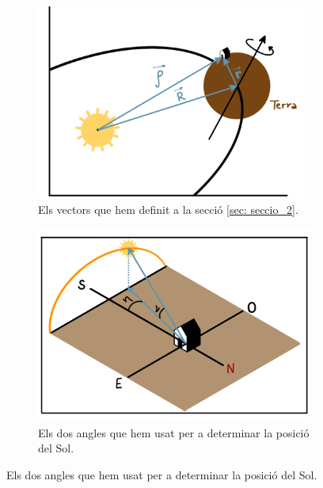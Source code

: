 \documentclass[11pt]{article}
\begin{document}
\begin{figure}[hbt]
    \centering
    \begin{subfigure}{0.5\textwidth}
        \centering
        \includegraphics[width=\textwidth]{vectors.PNG}
        \caption{Els vectors que hem definit a la secció \ref{sec: seccio_2}.}
        \label{fig: sist_vectors}
    \end{subfigure}%
    \hspace{0.000001\textwidth}%
    \begin{subfigure}{0.5\textwidth}
        \centering
        \includegraphics[width=\textwidth]{ang_sol.PNG}
        \caption{Els dos angles que hem usat per a determinar la posició del Sol.}
        \label{fig: sist_sol}
    \end{subfigure}
\end{figure}
\end{document}
